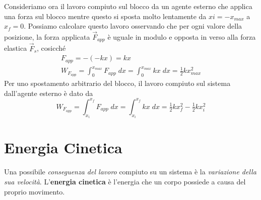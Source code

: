 \documentclass[a4paper,11pt,oneside]{book}
\begin{document}
Consideriamo ora il lavoro compiuto sul blocco da un agente esterno che applica una forza sul blocco mentre questo si sposta molto lentamente da $xi = -x_{max}$ a $x_f = 0$.
Possiamo calcolare questo lavoro osservando che per ogni valore della posizione, la forza applicata $\vec{F}_{app}$ è uguale in modulo e opposta in verso alla forza elastica $\vec{F}_s$, cosicché
\begin{gather*}
    F_{app} = -(-kx) = kx \\ 
    W_{F_{app}} = \int_{0}^{x_{max}} F_{app} \; dx = \int_{0}^{x_{max}} kx \; dx = \tfrac{1}{2}kx^2_{max}
\end{gather*}
Per uno spostamento arbitrario del blocco, il lavoro compiuto sul sistema dall'agente esterno è dato da 
\begin{equation*}
    W_{F_{app}} = \int_{x_i}^{x_f} F_{app} \; dx = \int_{x_i}^{x_f} kx \; dx = \tfrac{1}{2}kx_f^2 - \tfrac{1}{2} kx_i^2
\end{equation*}

\section{Energia Cinetica}
Una possibile \emph{conseguenza del lavoro} compiuto su un sistema è la \emph{variazione della sua velocità}. L'\textbf{energia cinetica} è l'energia che un corpo possiede a causa del proprio movimento.
\end{document}
